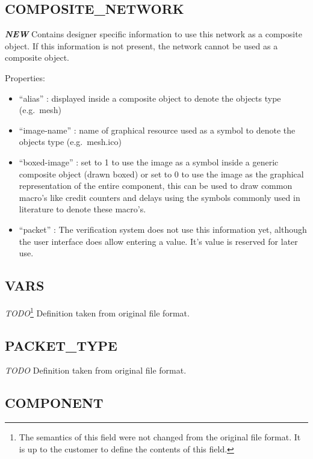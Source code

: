 \subsection{COMPOSITE\_NETWORK}\label{compositeux5fnetwork}

\textbf{\emph{NEW}} Contains designer specific information to use this
network as a composite object. If this information is not present, the
network cannot be used as a composite object.

Properties:

\begin{itemize}
\itemsep1pt\parskip0pt
\item
  ``alias'' : displayed inside a composite object to denote the objects
  type (e.g.~mesh)
\item
  ``image-name'' : name of graphical resource used as a symbol to denote
  the objects type (e.g.~mesh.ico)
\item
  ``boxed-image'' : set to 1 to use the image as a symbol inside a
  generic composite object (drawn boxed) or set to 0 to use the image as
  the graphical representation of the entire component, this can be used
  to draw common macro's like credit counters and delays using the
  symbols commonly used in literature to denote these macro's.
\item
  ``packet'' : The verification system does not use this information yet, 
  				although the user interface does allow entering a value.
  				It's value is reserved for later use.
\end{itemize}

\subsection{VARS}\label{vars}

\emph{TODO}\footnote{\label{fileformat-todo}The semantics of this field 
were not changed from the original file format.
It is up to the customer to define the contents of this field.}
Definition taken from original file format.

\subsection{PACKET\_TYPE}\label{packettype}

\emph{TODO}
Definition taken from original file format.

\subsection{COMPONENT}\label{component}

